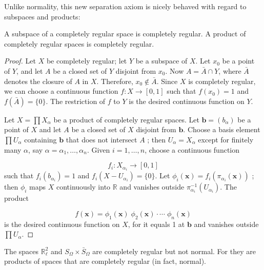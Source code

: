 Unlike normality, this new separation axiom is nicely behaved with regard to subspaces and products:

\begin{theorem}
\label{thm:\thetheorem}
 A subspace of a completely regular space is completely regular. A product of completely regular spaces is completely regular.
\end{theorem}
\begin{proof}
 Let \(X\) be completely regular; let \(Y\) be a subspace of \(X\). Let \(x_{0}\) be a point of \(Y\), and let \(A\) be a closed set of \(Y\) disjoint from \(x_{0}\). Now \(A = \bar{A} \cap Y\), where \(\bar{A}\) denotes the closure of \(A\) in \(X\). Therefore, \(x_{0} \notin \bar{A}\). Since \(X\) is completely regular, we can choose a continuous function \(f : X \rightarrow [ {0,1}]\) such that \(f( x_{0}) = 1\) and \(f( \bar{A}) = \{ 0\}\). The restriction of \(f\) to \(Y\) is the desired continuous function on \(Y\).

Let \(X = \prod {X}_{\alpha }\) be a product of completely regular spaces. Let \(\mathbf{b} = ( b_{\alpha })\) be a point of \(X\) and let \(A\) be a closed set of \(X\) disjoint from \(\mathbf{b}\). Choose a basis element \(\prod {U}_{\alpha }\) containing \(\mathbf{b}\) that does not intersect \(A\) ; then \(U_{\alpha } = X_{\alpha }\) except for finitely many \(\alpha\), say \(\alpha = {\alpha }_{1},\ldots ,{\alpha }_{n}\). Given \(i = 1,\ldots, n\), choose a continuous function

\[
f_{i} : X_{{\alpha }_{i}} \rightarrow [ {0,1}]
\]
such that \(f_{i}( b_{{\alpha }_{i}}) = 1\) and \(f_{i}( {X - U_{{\alpha }_{i}}}) = \{ 0\}\). Let \({\phi }_{i}( \mathbf{x}) = f_{i}( {{\pi }_{{\alpha }_{i}}( \mathbf{x}) })\) ; then \({\phi }_{i}\) maps \(X\) continuously into \(\mathbb{R}\) and vanishes outside \({\pi }_{{\alpha }_{i}}^{-1}( U_{{\alpha }_{i}})\). The product

\[
f( \mathbf{x}) = {\phi }_{1}( \mathbf{x}) \;{\phi }_{2}( \mathbf{x}) \cdot \cdots \;{\phi }_{n}( \mathbf{x})
\]
is the desired continuous function on \(X\), for it equals 1 at \(\mathbf{b}\) and vanishes outside \(\prod {U}_{\alpha }\).
\end{proof}

\begin{centeredblock}
\begin{example}
\label{ex:\thesection.\theexample}
 The spaces \(\mathbb{R}_{\ell }^{2}\) and \(S_{\Omega } \times {\bar{S}}_{\Omega }\) are completely regular but not normal. For they are products of spaces that are completely regular (in fact, normal).
\end{example}
\end{centeredblock}

